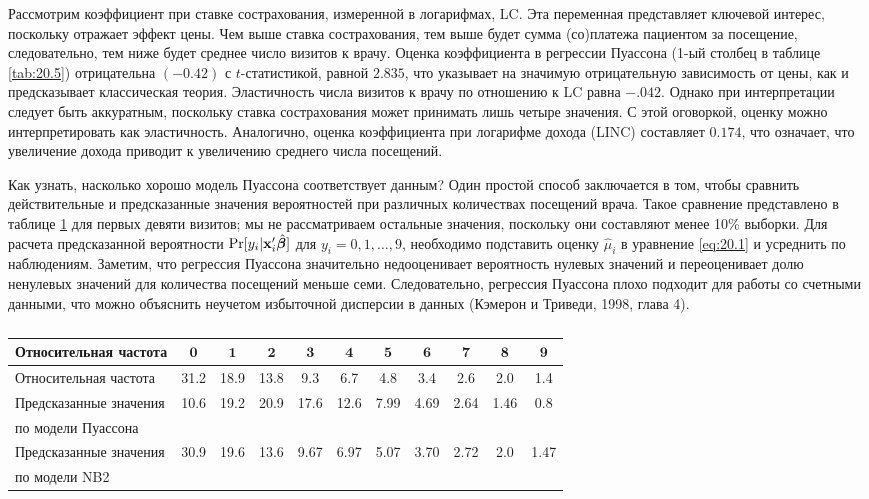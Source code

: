 Рассмотрим коэффициент при ставке сострахования, измеренной в логарифмах, LC. Эта переменная представляет ключевой интерес, поскольку отражает эффект цены. %
Чем выше ставка сострахования, тем выше будет сумма (со)платежа пациентом за посещение, следовательно, тем ниже будет среднее число визитов к врачу. Оценка коэффициента в регрессии Пуассона (1-ый столбец в таблице \ref{tab:20.5}) отрицательна $(-0.42)$ с $t$-статистикой, равной $2.835$, что указывает на значимую отрицательную зависимость от цены, как и предсказывает классическая теория. Эластичность числа визитов к врачу по отношению к LC равна $-.042$. Однако при интерпретации следует быть аккуратным, поскольку ставка сострахования может принимать лишь четыре значения. С этой оговоркой, оценку можно интерпретировать как эластичность. Аналогично, оценка коэффициента при логарифме дохода (LINC) составляет $0.174$, что означает, что увеличение дохода приводит к увеличению среднего числа посещений.

Как узнать, насколько хорошо модель Пуассона соответствует данным? Один простой способ заключается в том, чтобы сравнить действительные и предсказанные значения вероятностей при различных количествах посещений врача. Такое сравнение представлено в таблице \ref{tab:20.6} для первых девяти визитов; мы не рассматриваем остальные значения, поскольку они составляют менее 10\% выборки. Для расчета предсказанной вероятности $\mathrm{Pr}[y_i|\mathbf{x}'_i\hat{\bm{\beta}}]$ для $y_i = 0, 1, \ldots , 9$, необходимо подставить оценку $\hat{\mu}_i$ в уравнение \ref{eq:20.1} и усреднить по наблюдениям. Заметим, что регрессия Пуассона значительно недооценивает вероятность нулевых значений и переоценивает долю ненулевых значений для количества посещений меньше семи. Следовательно, регрессия Пуассона плохо подходит для работы со счетными данными, что можно объяснить неучетом избыточной дисперсии в данных (Кэмерон и Триведи, 1998, глава 4).

    \begin{table}[!htbp]\caption{\textit{}}\label{tab:20.6}
    \begin{center}
\begin{tabular}{lcccccccccc}
\hline \hline
\textbf{Относительная частота} &$\mathbf{0}$&$\mathbf{1}$&$\mathbf{2}$&$\mathbf{3}$&$\mathbf{4}$&$\mathbf{5}$&$\mathbf{6}$&$\mathbf{7}$&$\mathbf{8}$&$\mathbf{9}$\\
\hline
Относительная частота           &31.2&18.9&13.8&9.3&6.7&4.8&3.4&2.6&2.0&1.4\\
Предсказанные значения          &10.6&19.2&20.9&17.6&12.6&7.99&4.69&2.64&1.46&0.8\\
по модели Пуассона              &&&&&&&&&&\\
Предсказанные значения          &30.9&19.6&13.6&9.67&6.97&5.07&3.70&2.72&2.0&1.47\\
по модели NB2                   &&&&&&&&&&\\
\hline \hline
\end{tabular}
    \end{center}
    \end{table}

